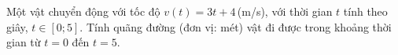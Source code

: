 \begin{ex}%
Một vật chuyển động với tốc độ $v(t)=3t+4$\,(m/s), với thời gian $t$ tính theo giây, $t\in[0;5]$. Tính quãng đường (đơn vị: mét) vật đi được trong khoảng thời gian từ $t=0$ đến $t=5$.
\par{}
\end{ex}

